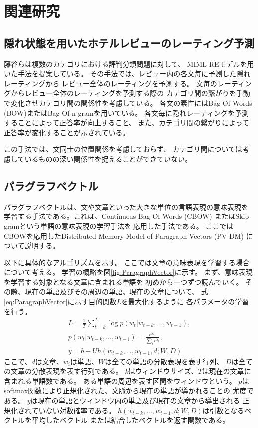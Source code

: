 \documentclass[twocolumn,a4paper]{ltjarticle}
\begin{document}
\section{関連研究}

\subsection{隠れ状態を用いたホテルレビューのレーティング予測}

藤谷ら\cite{fujitani15}は複数のカテゴリにおける評判分類問題に対して、
MIML-REモデルを用いた手法を提案している。
その手法では、レビュー内の各文毎に予測した隠れレーティングから
レビュー全体のレーティングを予測する。
文毎のレーティングからレビュー全体のレーティングを予測する際の
カテゴリ間の繋がりを手動で変化させカテゴリ間の関係性を考慮している。
各文の素性にはBag Of Words (BOW)またはBag Of n-gramを用いている。
各文毎に隠れレーティングを予測することによって正答率が向上すること、
また、カテゴリ間の繋がりによって正答率が変化することが示されている。

この手法では、文同士の位置関係を考慮しておらず、
カテゴリ間については考慮しているものの深い関係性を捉えることができていない。


\subsection{パラグラフベクトル}

パラグラフベクトルは、文や文章といった大きな単位の言語表現の意味表現を
学習する手法である。これは、Continuous Bag Of Words (CBOW)
またはSkip-gram\cite{yoshua03}という単語の意味表現の学習手法を
応用した手法である。
ここではCBOWを応用したDistributed Memory Model of Paragraph Vectors (PV-DM)
について説明する。

以下に具体的なアルゴリズムを示す。
ここでは文章の意味表現を学習する場合について考える。
学習の概略を図\ref{fig:ParagraphVector}に示す。
まず、意味表現を学習する対象となる文章に含まれる単語を
初めから一つずつ読んでいく。
その際、現在の単語及びその周辺の単語、現在の文章について、
式\ref{eq:ParagraphVector}に示す目的関数$L$を最大化するように
各パラメータの学習を行う。
\begin{gather}
  L = \frac{1}{T} \sum^{T}_{t = k} \log p(w_t | w_{t-k}, ..., w_{t-1}),
    \label{eq:ParagraphVector} \\
  p(w_t | w_{t-k}, ..., w_{t-1}) = \frac{e^{y_{w_t}}}{\sum_i e^{y_i}},
    \nonumber \\
  y = b + Uh(w_{t-k}, ..., w_{t-1}, d; W, D) \nonumber
\end{gather}
ここで、$d$は文章、$w_i$は単語、$W$は全ての単語の分散表現を表す行列、
$D$は全ての文章の分散表現を表す行列である。
$k$はウィンドウサイズ、$T$は現在の文章に含まれる単語数である。
ある単語の周辺を表す区間をウィンドウという。
$p$はsoftmax関数により正規化された、文脈から現在の単語が導かれることの
尤度である。
$y$は現在の単語とウィンドウ内の単語及び現在の文章から導出される
正規化されていない対数確率である。
$h(w_{t-k}, ..., w_{t-1}, d; W, D)$は引数となるベクトルを平均したベクトル
または結合したベクトルを返す関数である。
\end{document}
